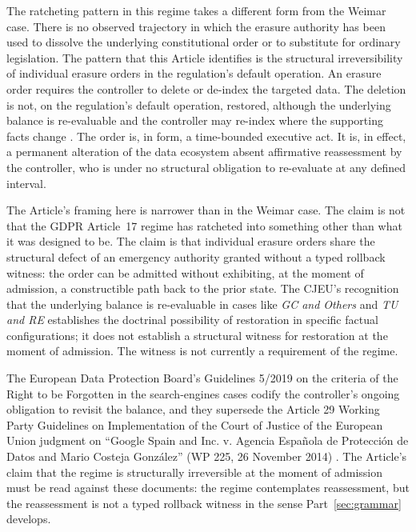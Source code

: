 The ratcheting pattern in this regime takes a different form from the Weimar case.
There is no observed trajectory in which the erasure authority has been used to dissolve the underlying
constitutional order or to substitute for ordinary legislation.
The pattern that this Article identifies is the structural irreversibility of individual erasure orders
in the regulation's default operation.
An erasure order requires the controller to delete or de-index the targeted data.
The deletion is not, on the regulation's default operation, restored, although the underlying balance
is re-evaluable and the controller may re-index where the supporting facts change
\cite{ref_kuner_gdpr_erasure}.
The order is, in form, a time-bounded executive act.
It is, in effect, a permanent alteration of the data ecosystem absent affirmative reassessment by the
controller, who is under no structural obligation to re-evaluate at any defined interval.

The Article's framing here is narrower than in the Weimar case.
The claim is not that the GDPR Article~17 regime has ratcheted into something other than what it was
designed to be.
The claim is that individual erasure orders share the structural defect of an emergency authority
granted without a typed rollback witness: the order can be admitted without exhibiting, at the moment
of admission, a constructible path back to the prior state.
The CJEU's recognition that the underlying balance is re-evaluable in cases like \emph{GC and Others}
and \emph{TU and RE} establishes the doctrinal possibility of restoration in specific factual
configurations; it does not establish a structural witness for restoration at the moment of admission.
The witness is not currently a requirement of the regime.

The European Data Protection Board's Guidelines 5/2019 on the criteria of the Right to be Forgotten in
the search-engines cases \cite{ref_edpb_guidelines_5_2019} codify the controller's ongoing obligation
to revisit the balance, and they supersede the Article 29 Working Party Guidelines on Implementation of
the Court of Justice of the European Union judgment on ``Google Spain and Inc. v. Agencia Espa\~nola de
Protecci\'on de Datos and Mario Costeja Gonz\'alez'' (WP 225, 26 November 2014)
\cite{ref_a29_wp225_2014}.
The Article's claim that the regime is structurally irreversible at the moment of admission must be
read against these documents: the regime contemplates reassessment, but the reassessment is not a
typed rollback witness in the sense Part~\ref{sec:grammar} develops.

